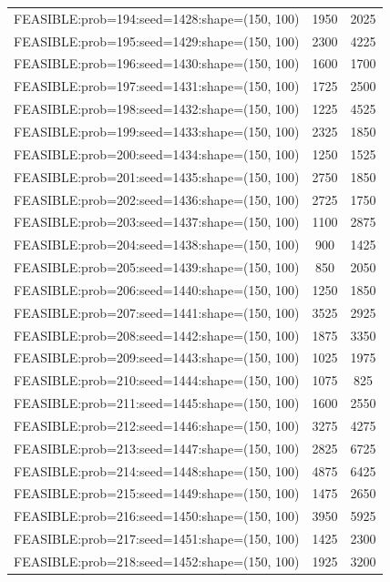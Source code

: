 \begin{longtable}{lcc}
FEASIBLE:prob=194:seed=1428:shape=(150, 100) &     1950 &  2025 \\
FEASIBLE:prob=195:seed=1429:shape=(150, 100) &     2300 &  4225 \\
FEASIBLE:prob=196:seed=1430:shape=(150, 100) &     1600 &  1700 \\
FEASIBLE:prob=197:seed=1431:shape=(150, 100) &     1725 &  2500 \\
FEASIBLE:prob=198:seed=1432:shape=(150, 100) &     1225 &  4525 \\
FEASIBLE:prob=199:seed=1433:shape=(150, 100) &     2325 &  1850 \\
FEASIBLE:prob=200:seed=1434:shape=(150, 100) &     1250 &  1525 \\
FEASIBLE:prob=201:seed=1435:shape=(150, 100) &     2750 &  1850 \\
FEASIBLE:prob=202:seed=1436:shape=(150, 100) &     2725 &  1750 \\
FEASIBLE:prob=203:seed=1437:shape=(150, 100) &     1100 &  2875 \\
FEASIBLE:prob=204:seed=1438:shape=(150, 100) &      900 &  1425 \\
FEASIBLE:prob=205:seed=1439:shape=(150, 100) &      850 &  2050 \\
FEASIBLE:prob=206:seed=1440:shape=(150, 100) &     1250 &  1850 \\
FEASIBLE:prob=207:seed=1441:shape=(150, 100) &     3525 &  2925 \\
FEASIBLE:prob=208:seed=1442:shape=(150, 100) &     1875 &  3350 \\
FEASIBLE:prob=209:seed=1443:shape=(150, 100) &     1025 &  1975 \\
FEASIBLE:prob=210:seed=1444:shape=(150, 100) &     1075 &   825 \\
FEASIBLE:prob=211:seed=1445:shape=(150, 100) &     1600 &  2550 \\
FEASIBLE:prob=212:seed=1446:shape=(150, 100) &     3275 &  4275 \\
FEASIBLE:prob=213:seed=1447:shape=(150, 100) &     2825 &  6725 \\
FEASIBLE:prob=214:seed=1448:shape=(150, 100) &     4875 &  6425 \\
FEASIBLE:prob=215:seed=1449:shape=(150, 100) &     1475 &  2650 \\
FEASIBLE:prob=216:seed=1450:shape=(150, 100) &     3950 &  5925 \\
FEASIBLE:prob=217:seed=1451:shape=(150, 100) &     1425 &  2300 \\
FEASIBLE:prob=218:seed=1452:shape=(150, 100) &     1925 &  3200 \\

\end{longtable}
